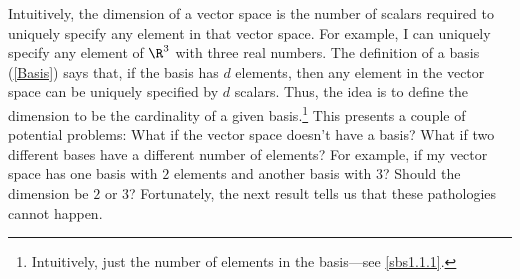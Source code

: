 Intuitively, the dimension of a vector space is the number of scalars required to uniquely specify any element in that vector space.  For example, I can uniquely specify any element of $\R ^3$ with three real numbers.  The definition of a basis (\cref{Basis}) says that, if the basis has $d$ elements, then any element in the vector space can be uniquely specified by $d$ scalars.  Thus, the idea is to define the dimension to be the cardinality of a given basis.\footnote{Intuitively, just the number of elements in the basis---see \cref{sbs1.1.1}.}  This presents a couple of potential problems:  What if the vector space doesn't have a basis?  What if two different bases have a different number of elements?  For example, if my vector space has one basis with $2$ elements and another basis with $3$?  Should the dimension be $2$ or $3$?  Fortunately, the next result tells us that these pathologies cannot happen.
